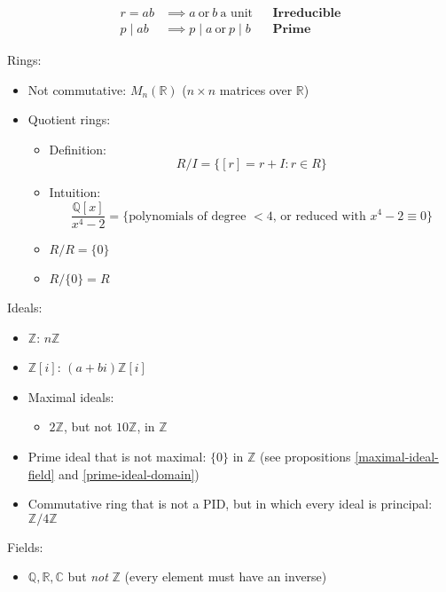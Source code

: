 \begin{align*}
    r = ab &\implies a \ \text{or} \ b \ \text{a unit} &&\textbf{Irreducible} \\
    p \mid ab &\implies p \mid a \ \text{or} \ p \mid b &&\textbf{Prime}
\end{align*}

Rings:
    \begin{itemize}
        \item Not commutative: $M_n(\mathbb{R})$ ($n \times n$ matrices over $\mathbb{R}$)
        \item Quotient rings:
            \begin{itemize}
                \item Definition:
                    $$ R/I = \{ [r] = r + I : r \in R \} $$
                \item Intuition:
                    $$ \frac{\mathbb{Q}[x]}{x^4 - 2} = \{ \text{polynomials of degree $<4$, or reduced with $x^4 - 2 \equiv 0$} \} $$
                \item $R/R = \{0\}$
                \item $R/\{0\} = R$
            \end{itemize}
    \end{itemize}

Ideals:
    \begin{itemize}
        \item $\mathbb{Z}$: $n\mathbb{Z}$
        \item $\mathbb{Z}[i]$: $(a + bi) \mathbb{Z}[i]$
        \item Maximal ideals:
            \begin{itemize}
                \item $2\mathbb{Z}$, but not $10\mathbb{Z}$, in $\mathbb{Z}$
            \end{itemize}
        \item Prime ideal that is not maximal: $\{0\}$ in $\mathbb{Z}$ (see propositions \ref{maximal-ideal-field} and \ref{prime-ideal-domain})
        \item Commutative ring that is not a PID, but in which every ideal is principal: $\mathbb{Z}/4\mathbb{Z}$
    \end{itemize}

Fields:
    \begin{itemize}
        \item $\mathbb{Q}, \mathbb{R}, \mathbb{C}$ but \textit{not} $\mathbb{Z}$ (every element must have an inverse)
    \end{itemize}

